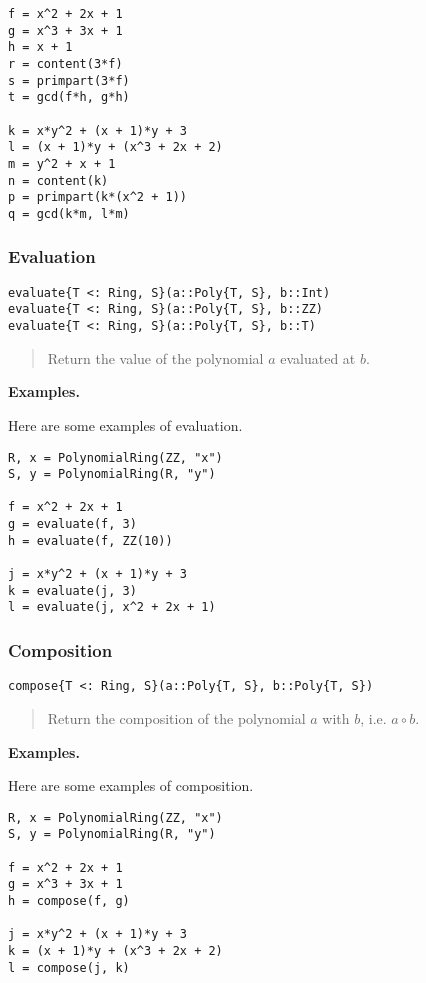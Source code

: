 \documentclass[a4paper,10pt]{article}
\newcommand{\desc}[1]{\vspace{-3mm}\begin{quote}#1\end{quote}}
\begin{document}
{{{\begin{lstlisting}
f = x^2 + 2x + 1
g = x^3 + 3x + 1
h = x + 1
r = content(3*f)
s = primpart(3*f)
t = gcd(f*h, g*h)

k = x*y^2 + (x + 1)*y + 3
l = (x + 1)*y + (x^3 + 2x + 2)
m = y^2 + x + 1
n = content(k)
p = primpart(k*(x^2 + 1))
q = gcd(k*m, l*m)
\end{lstlisting}

\subsubsection{Evaluation}

\begin{lstlisting}
evaluate{T <: Ring, S}(a::Poly{T, S}, b::Int)
evaluate{T <: Ring, S}(a::Poly{T, S}, b::ZZ)
evaluate{T <: Ring, S}(a::Poly{T, S}, b::T)
\end{lstlisting}

\desc{Return the value of the polynomial $a$ evaluated at $b$.}

\textbf{Examples.}

Here are some examples of evaluation.

\begin{lstlisting}
R, x = PolynomialRing(ZZ, "x")
S, y = PolynomialRing(R, "y")

f = x^2 + 2x + 1
g = evaluate(f, 3)
h = evaluate(f, ZZ(10))

j = x*y^2 + (x + 1)*y + 3
k = evaluate(j, 3)
l = evaluate(j, x^2 + 2x + 1)
\end{lstlisting}

\subsubsection{Composition}

\begin{lstlisting}
compose{T <: Ring, S}(a::Poly{T, S}, b::Poly{T, S})
\end{lstlisting}

\desc{Return the composition of the polynomial $a$ with $b$, i.e. $a \circ b$.}

\textbf{Examples.}

Here are some examples of composition.

\begin{lstlisting}
R, x = PolynomialRing(ZZ, "x")
S, y = PolynomialRing(R, "y")

f = x^2 + 2x + 1
g = x^3 + 3x + 1
h = compose(f, g)

j = x*y^2 + (x + 1)*y + 3
k = (x + 1)*y + (x^3 + 2x + 2)
l = compose(j, k)
\end{lstlisting}

}}}
\end{document}
